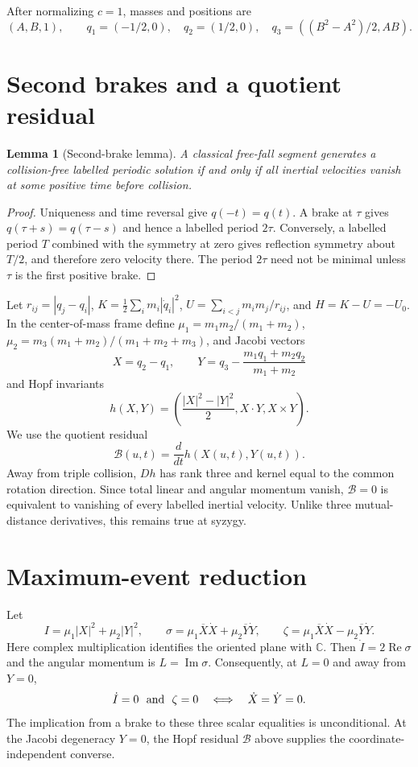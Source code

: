 \documentclass[11pt]{article}
\newtheorem{lemma}[theorem]{Lemma}
\newcommand{\Bcal}{\mathcal B}
\begin{document}
After normalizing $c=1$, masses and positions are
\[
(A,B,1),\qquad q_1=(-1/2,0),\quad q_2=(1/2,0),\quad
q_3=((B^2-A^2)/2,AB).
\]

\section{Second brakes and a quotient residual}

\begin{lemma}[Second-brake lemma]
A classical free-fall segment generates a collision-free labelled periodic
solution if and only if all inertial velocities vanish at some positive time
before collision.
\end{lemma}
\begin{proof}
Uniqueness and time reversal give $q(-t)=q(t)$.  A brake at $\tau$ gives
$q(\tau+s)=q(\tau-s)$ and hence a labelled period $2\tau$.  Conversely, a
labelled period $T$ combined with the symmetry at zero gives reflection
symmetry about $T/2$, and therefore zero velocity there.  The period $2\tau$
need not be minimal unless $\tau$ is the first positive brake.
\end{proof}

Let $r_{ij}=|q_j-q_i|$, $K=\tfrac12\sum_i m_i|\dot q_i|^2$,
$U=\sum_{i<j}m_im_j/r_{ij}$, and $H=K-U=-U_0$. In the center-of-mass
frame define $\mu_1=m_1m_2/(m_1+m_2)$,
$\mu_2=m_3(m_1+m_2)/(m_1+m_2+m_3)$, and Jacobi vectors
\[
X=q_2-q_1,\qquad
Y=q_3-\frac{m_1q_1+m_2q_2}{m_1+m_2}
\]
and Hopf invariants
\[
h(X,Y)=\left(\frac{|X|^2-|Y|^2}{2},X\cdot Y,X\times Y\right).
\]
We use the quotient residual
\[
\Bcal(u,t)=\frac{d}{dt}h(X(u,t),Y(u,t)).
\]
Away from triple collision, $Dh$ has rank three and kernel equal to the common
rotation direction.  Since total linear and angular momentum vanish,
$\Bcal=0$ is equivalent to vanishing of every labelled inertial velocity.
Unlike three mutual-distance derivatives, this remains true at syzygy.

\section{Maximum-event reduction}

Let
\[
 I=\mu_1|X|^2+\mu_2|Y|^2,\qquad
 \sigma=\mu_1\overline X\dot X+\mu_2\overline Y\dot Y,
 \qquad
 \zeta=\mu_1\overline X\dot X-\mu_2\overline Y\dot Y .
\]
Here complex multiplication identifies the oriented plane with $\mathbb C$.
Then $\dot I=2\operatorname{Re}\sigma$ and the angular momentum is
$L=\operatorname{Im}\sigma$.  Consequently, at $L=0$ and away from $Y=0$,
\[
 \dot I=0\ \hbox{ and }\ \zeta=0
 \quad\Longleftrightarrow\quad
 \dot X=\dot Y=0.
\]
The implication from a brake to these three scalar equalities is
unconditional.  At the Jacobi degeneracy $Y=0$, the Hopf residual $\Bcal$
above supplies the coordinate-independent converse.
\end{document}
